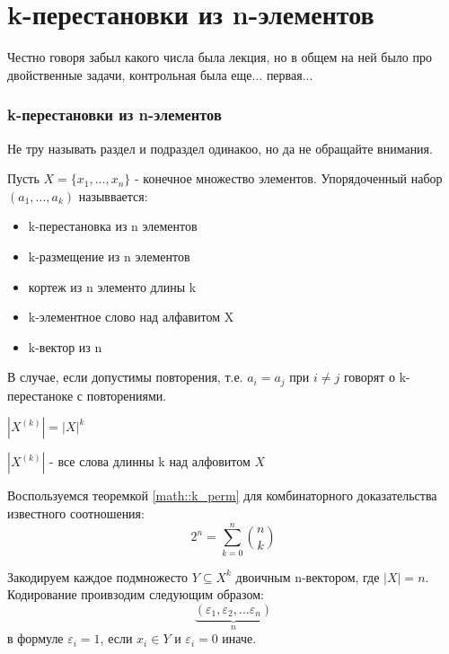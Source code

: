 \chapter{k-перестановки из n-элементов}

Честно говоря забыл какого числа была лекция, но в общем на ней было про двойственные задачи, контрольная была еще... первая...

\subsection{k-перестановки из n-элементов}

Не тру называть раздел и подраздел одинакоо, но да не обращайте внимания.

\begin{Def}
Пусть $X=\{x_1, ... ,x_n\}$ - конечное множество элементов. Упорядоченный набор $\left(a_1, ... ,a_k\right)$ назыввается:
\begin{itemize}
	\item k-перестановка из n элементов

	\item k-размещение из n элементов

	\item кортеж из n элементо длины k

	\item k-элементное слово над алфавитом X

	\item k-вектор из n
\end{itemize}
В случае, если допустимы повторения, т.е. $a_i=a_j$ при $i \ne j$ говорят о
k-перестаноке с повторениями.
\end{Def}

\begin{Th}
$\left|X^{\left(k\right)}\right| = {\left|X\right|}^k$

$\left|X^{\left(k\right)}\right|$ - все слова длинны k над алфовитом $X$ 
\label{math::k_perm}
\end{Th}

Воспользуемся теоремкой \ref{math::k_perm} для комбинаторного доказательства известного соотношения:
\[
	2^n = \sum _{k=0} ^n \binom{n}{k}
\]

Закодируем каждое подмножесто $Y \subseteq X^k$ двоичным n-вектором, где $\left|X\right| = n$. Кодирование проивзодим следующим образом:
\[
	\underbrace{
		\left(\varepsilon_1, \varepsilon_2, ... \varepsilon_n\right)
	}_n
\]
в формуле $\varepsilon_i = 1$, если $x_i \in Y$ и $\varepsilon_i = 0$ иначе.


